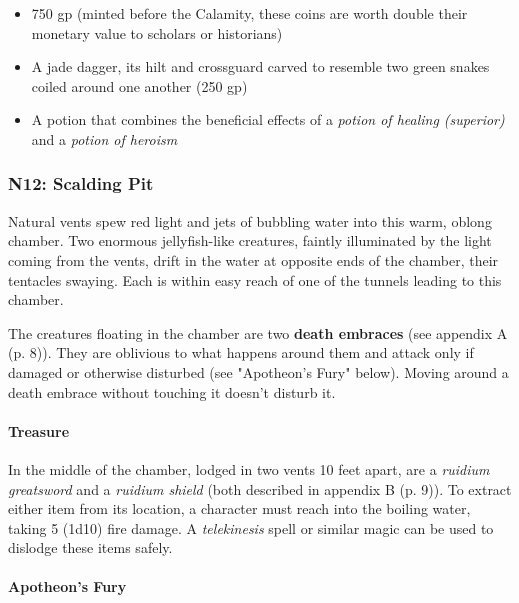 \documentclass[a4paper, 11pt, bg=full, twocolumn, nooutline]{dndbook}
\begin{document}
\begin{itemize}
\item 750 gp (minted before the Calamity, these coins are worth double their monetary value to scholars or historians)
\item A jade dagger, its hilt and crossguard carved to resemble two green snakes coiled around one another (250 gp)
\item A potion that combines the beneficial effects of a \textit{potion of healing (superior)} and a \textit{potion of heroism}
\end{itemize}

\subsubsection{N12: Scalding Pit}

\begin{DndReadAloud}
Natural vents spew red light and jets of bubbling water into this warm, oblong chamber. Two enormous jellyfish-like creatures, faintly illuminated by the light coming from the vents, drift in the water at opposite ends of the chamber, their tentacles swaying. Each is within easy reach of one of the tunnels leading to this chamber.
\end{DndReadAloud}


The creatures floating in the chamber are two \textbf{death embraces} (see appendix A (p. 8)). They are oblivious to what happens around them and attack only if damaged or otherwise disturbed (see "Apotheon's Fury" below). Moving around a death embrace without touching it doesn't disturb it.

\paragraph{Treasure}

In the middle of the chamber, lodged in two vents 10 feet apart, are a \textit{ruidium greatsword} and a \textit{ruidium shield} (both described in appendix B (p. 9)). To extract either item from its location, a character must reach into the boiling water, taking 5 (1d10) fire damage. A \textit{telekinesis} spell or similar magic can be used to dislodge these items safely.

\paragraph{Apotheon's Fury}
\end{document}
